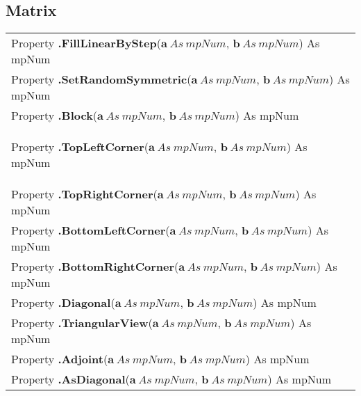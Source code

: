 \subsection{Matrix}
\begin{tabular}{p{481pt}}
	\toprule
	
	\textsf{Property \textbf{.FillLinearByStep}($\boldsymbol{a}\ As\ mpNum$, $\boldsymbol{b}\ As\ mpNum$) As mpNum}\index{Multiprecision Properties!.FillLinearByStep} \\
	
	\textsf{Property \textbf{.SetRandomSymmetric}($\boldsymbol{a}\ As\ mpNum$, $\boldsymbol{b}\ As\ mpNum$) As mpNum}\index{Multiprecision Properties!.SetRandomSymmetric} \\
	
	
	\textsf{Property \textbf{.Block}($\boldsymbol{a}\ As\ mpNum$, $\boldsymbol{b}\ As\ mpNum$) As mpNum}\index{Multiprecision Properties!.Block} \\
	\hypertarget{TopLeftCorner_HT}{}
	\textsf{Property \textbf{.TopLeftCorner}($\boldsymbol{a}\ As\ mpNum$, $\boldsymbol{b}\ As\ mpNum$) As mpNum}\index{Multiprecision Properties!.TopLeftCorner} \\
	
	\textsf{Property \textbf{.TopRightCorner}($\boldsymbol{a}\ As\ mpNum$, $\boldsymbol{b}\ As\ mpNum$) As mpNum}\index{Multiprecision Properties!.TopRightCorner} \\
	\textsf{Property \textbf{.BottomLeftCorner}($\boldsymbol{a}\ As\ mpNum$, $\boldsymbol{b}\ As\ mpNum$) As mpNum}\index{Multiprecision Properties!.BottomLeftCorner} \\
	\textsf{Property \textbf{.BottomRightCorner}($\boldsymbol{a}\ As\ mpNum$, $\boldsymbol{b}\ As\ mpNum$) As mpNum}\index{Multiprecision Properties!.BottomRightCorner} \\
	\textsf{Property \textbf{.Diagonal}($\boldsymbol{a}\ As\ mpNum$, $\boldsymbol{b}\ As\ mpNum$) As mpNum}\index{Multiprecision Properties!.Diagonal} \\
	\textsf{Property \textbf{.TriangularView}($\boldsymbol{a}\ As\ mpNum$, $\boldsymbol{b}\ As\ mpNum$) As mpNum}\index{Multiprecision Properties!.TriangularView} \\
	\textsf{Property \textbf{.Adjoint}($\boldsymbol{a}\ As\ mpNum$, $\boldsymbol{b}\ As\ mpNum$) As mpNum}\index{Multiprecision Properties!.Adjoint} \\
	\textsf{Property \textbf{.AsDiagonal}($\boldsymbol{a}\ As\ mpNum$, $\boldsymbol{b}\ As\ mpNum$) As mpNum}\index{Multiprecision Properties!.AsDiagonal} \\
	\bottomrule
\end{tabular}

